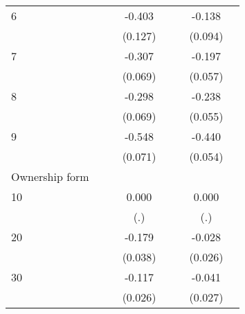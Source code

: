 {\begin{longtable}{l*{3}{c}|l*{3}{c}}
		6                   &                     &                     &      -0.403\sym{**} &                     &                     &      -0.138         \\
		&                     &                     &     (0.127)         &                     &                     &     (0.094)         \\
		7                   &                     &                     &      -0.307\sym{***}&                     &                     &      -0.197\sym{***}\\
		&                     &                     &     (0.069)         &                     &                     &     (0.057)         \\
		8                   &                     &                     &      -0.298\sym{***}&                     &                     &      -0.238\sym{***}\\
		&                     &                     &     (0.069)         &                     &                     &     (0.055)         \\
		9                   &                     &                     &      -0.548\sym{***}&                     &                     &      -0.440\sym{***}\\
		&                     &                     &     (0.071)         &                     &                     &     (0.054)         \\
		Ownership form &&&&&\\
		10                  &                     &                     &       0.000         &                     &                     &       0.000         \\
		&                     &                     &         (.)         &                     &                     &         (.)         \\
		20                  &                     &                     &      -0.179\sym{***}&                     &                     &      -0.028         \\
		&                     &                     &     (0.038)         &                     &                     &     (0.026)         \\
		30                  &                     &                     &      -0.117\sym{***}&                     &                     &      -0.041         \\
		&                     &                     &     (0.026)         &                     &                     &     (0.027)         \\

\end{longtable}}
